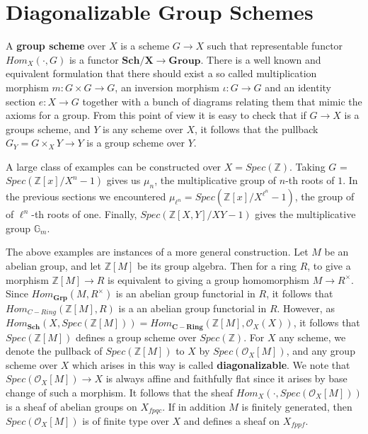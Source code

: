 \documentclass{ucbthesis}
\theoremstyle{definition}
\theoremstyle{theorem}
\begin{document}
\section{Diagonalizable Group Schemes}
A \textbf{group scheme} over $X$ is a scheme $G\rightarrow X$ such that representable functor $Hom_{X}(\cdot,G)$ is a functor $\mathbf{Sch/X} \rightarrow \mathbf{Group}$. There is a well known and equivalent formulation that there should exist a so called multiplication morphism $m:G\times G \rightarrow G$, an inversion morphism $\iota :G \rightarrow G$ and an identity section $e:X\rightarrow G$ together with a bunch of diagrams relating them that mimic the axioms for a group. From this point of view it is easy to check that if $G\rightarrow X$ is a groups scheme, and $Y$ is any scheme over $X$, it follows that the pullback $G_{Y} = G\times_{X} Y\rightarrow Y$ is a group scheme over $Y$. 

A large class of examples can be constructed over $X= Spec(\mathbb{Z})$. Taking $G$ = \\ $Spec(\mathbb{Z}[x]/X^{n}-1)$ gives us $\mu_{n}$, the multiplicative group of $n$-th roots of $1$. In the previous sections we encountered $\mu_{\ell^{n}} = Spec(\mathbb{Z}[x]/X^{\ell^{n}}-1)$, the group of of $\ell^{n}$-th roots of one. Finally, $Spec(\mathbb{Z}[X,Y]/XY-1)$ gives the multiplicative group $\mathbb{G}_{m}$.

The above examples are instances of a more general construction. Let $M$ be an abelian group, and let $\mathbb{Z}[M]$ be its group algebra. Then for a ring $R$, to give a morphism $\mathbb{Z}[M] \rightarrow R$ is equivalent to giving a group homomorphism $M\rightarrow R^{\times}$. Since $Hom_{\mathbf{Grp}}(M,R^{\times})$ is an abelian group functorial in $R$, it follows that $Hom_{C-Ring}(\mathbb{Z}[M],R)$ is a an abelian group functorial in $R$. However, as $Hom_{\mathbf{Sch}}(X, Spec(\mathbb{Z}[M])) = Hom_{\mathbf{C-Ring}}(\mathbb{Z}[M],\mathcal{O}_{X}(X))$, it follows that $Spec(\mathbb{Z}[M])$ defines a group scheme over $Spec(\mathbb{Z})$. For $X$ any scheme, we denote the pullback of $Spec(\mathbb{Z}[M])$ to $X$ by $Spec(\mathcal{O}_{X}[M])$, and any group scheme over $X$ which arises in this way is called \textbf{diagonalizable}. We note that $Spec(\mathcal{O}_{X}[M])\rightarrow X$ is always affine and faithfully flat since it arises by base change of such a morphism. It follows that the sheaf $Hom_{X}(\cdot, Spec(\mathcal{O}_{X}[M]))$ is a sheaf of abelian groups on $X_{fpqc}$. If in addition $M$ is finitely generated, then $Spec(\mathcal{O}_{X}[M])$ is of finite type over $X$ and defines a sheaf on $X_{fppf}$. 
\end{document}
